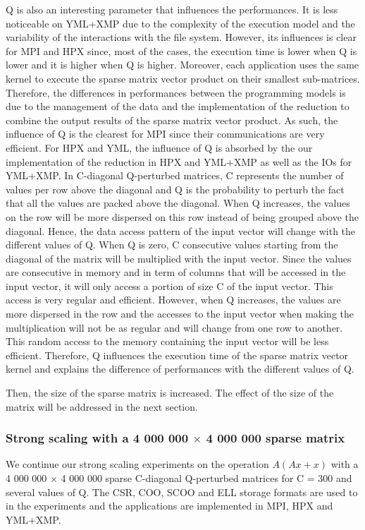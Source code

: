 Q is also an interesting parameter that influences the performances.
It is less noticeable on YML+XMP due to the complexity of the execution model and the variability of the interactions with the file system.
However, its influences is clear for MPI and HPX since, most of the cases, the execution time is lower when Q is lower and it is higher when Q is higher.
Moreover, each application uses the same kernel to execute the sparse matrix vector product on their smallest sub-matrices.
Therefore, the differences in performances between the programming models is due to the management of the data and the implementation of the reduction to combine the output results of the sparse matrix vector product.
As such, the influence of Q is the clearest for MPI since their communications are very efficient.
For HPX and YML, the influence of Q is absorbed by the our implementation of the reduction in HPX and YML+XMP as well as the IOs for YML+XMP.
In C-diagonal Q-perturbed matrices, C represents the number of values per row above the diagonal and Q is the probability to perturb the fact that all the values are packed above the diagonal.
When Q increases, the values on the row will be more dispersed on this row instead of being grouped above the diagonal.
Hence, the data access pattern of the input vector will change with the different values of Q.
When Q is zero, C consecutive values starting from the diagonal of the matrix will be multiplied with the input vector.
Since the values are consecutive in memory and in term of columns that will be accessed in the input vector, it will only access a portion of size C of the input vector.
This access is very regular and efficient.
However, when Q increases, the values are more dispersed in the row and the accesses to the input vector when making the multiplication will not be as regular and will change from one row to another.
This random access to the memory containing the input vector will be less efficient.
Therefore, Q influences the execution time of the sparse matrix vector kernel and explains the difference of performances with the different values of Q.

Then, the size of the sparse matrix is increased.
The effect of the size of the matrix will be addressed in the next section.

\subsubsection{Strong scaling with a 4 000 000 $\times$ 4 000 000 sparse matrix}
We continue our strong scaling experiments on the operation $A(Ax+x)$ with a 4 000 000 $\times$ 4 000 000 sparse C-diagonal Q-perturbed matrices for C = 300 and several values of Q.
The CSR, COO, SCOO and ELL storage formats are used to in the experiments and the applications are implemented in MPI, HPX and YML+XMP.

